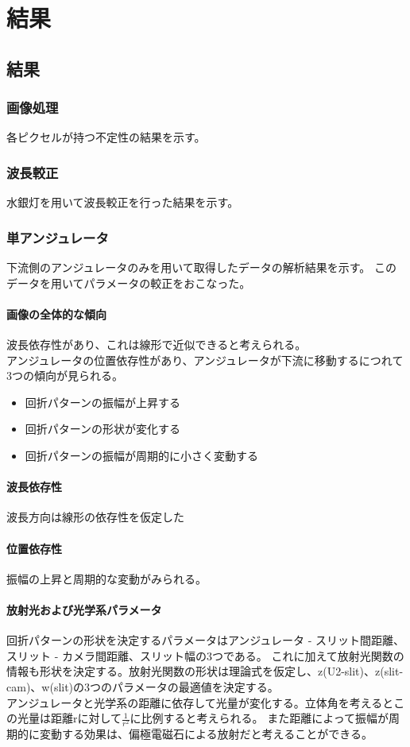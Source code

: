 \documentclass[a4paper,11pt,uplatex]{jsbook}
\begin{document}
\chapter{結果}
\section{結果}
\subsection{画像処理}
各ピクセルが持つ不定性の結果を示す。
\subsection{波長較正}
水銀灯を用いて波長較正を行った結果を示す。

\subsection{単アンジュレータ}
下流側のアンジュレータのみを用いて取得したデータの解析結果を示す。
このデータを用いてパラメータの較正をおこなった。
\subsubsection{画像の全体的な傾向}
波長依存性があり、これは線形で近似できると考えられる。\\
アンジュレータの位置依存性があり、アンジュレータが下流に移動するにつれて3つの傾向が見られる。
\begin{itemize}
  \item 回折パターンの振幅が上昇する
  \item 回折パターンの形状が変化する
  \item 回折パターンの振幅が周期的に小さく変動する
\end{itemize}
\subsubsection{波長依存性}
波長方向は線形の依存性を仮定した
\subsubsection{位置依存性}
振幅の上昇と周期的な変動がみられる。
\subsubsection{放射光および光学系パラメータ}
回折パターンの形状を決定するパラメータはアンジュレータ - スリット間距離、スリット - カメラ間距離、スリット幅の3つである。
これに加えて放射光関数の情報も形状を決定する。放射光関数の形状は理論式を仮定し、z(U2-slit)、z(slit-cam)、w(slit)の3つのパラメータの最適値を決定する。\\
アンジュレータと光学系の距離に依存して光量が変化する。立体角を考えるとこの光量は距離rに対して$\frac{1}{r^2}$に比例すると考えられる。
また距離によって振幅が周期的に変動する効果は、偏極電磁石による放射だと考えることができる。
\end{document}
